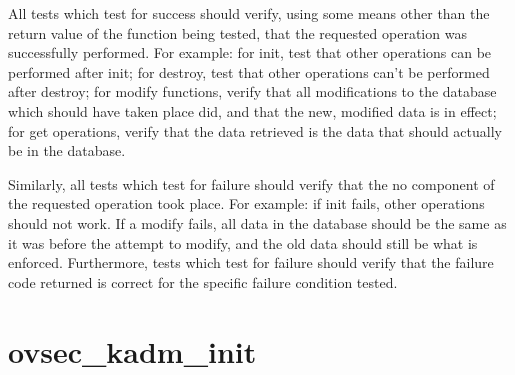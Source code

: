 All tests which test for success should verify, using some means other
than the return value of the function being tested, that the requested
operation was successfully performed.  For example: for init, test
that other operations can be performed after init; for destroy, test
that other operations can't be performed after destroy; for modify
functions, verify that all modifications to the database which should
have taken place did, and that the new, modified data is in effect;
for get operations, verify that the data retrieved is the data that
should actually be in the database.

Similarly, all tests which test for failure should verify that the
no component of the requested operation took place.  For example: if
init fails, other operations should not work.  If a modify fails, all
data in the database should be the same as it was before the attempt
to modify, and the old data should still be what is enforced.
Furthermore, tests which test for failure should verify that the
failure code returned is correct for the specific failure condition
tested.

\section{ovsec_kadm_init}








